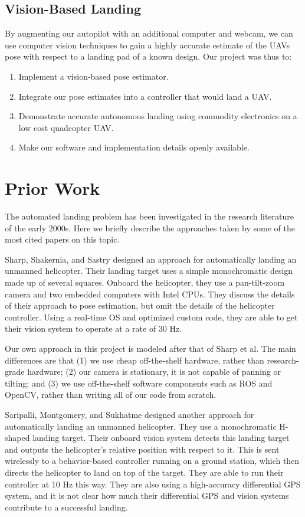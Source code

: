 \documentclass[10pt]{scrartcl} %
\begin{document}
\subsection{Vision-Based Landing}
By augmenting our autopilot with an additional computer and webcam, we can use computer vision techniques to gain a highly accurate estimate of the UAVs pose with respect to a landing pad of a known design.
Our project was thus to:
\begin{enumerate}
\item{Implement a vision-based pose estimator.}
\item{Integrate our pose estimates into a controller that would land a UAV.}
\item{Demonstrate accurate autonomous landing using commodity electronics on a low cost quadcopter UAV.}
\item{Make our software and implementation details openly available.}
\end{enumerate}

\section{Prior Work}

The automated landing problem has been investigated in the research literature
of the early 2000s. Here we briefly describe the approaches taken by some of
the most cited papers on this topic.

Sharp, Shakernia, and Sastry \cite{sharp_et_al_2001} designed an approach for
automatically landing an unmanned helicopter. Their landing target uses a
simple monochromatic design made up of several squares. Onboard the helicopter,
they use a pan-tilt-zoom camera and two embedded computers with Intel CPUs.
They discuss the details of their approach to pose estimation, but omit the
details of the helicopter controller. Using a real-time OS and optimized custom
code, they are able to get their vision system to operate at a rate of 30 Hz.

Our own approach in this project is modeled after that of Sharp et al. The main
differences are that (1) we use cheap off-the-shelf hardware, rather than
research-grade hardware; (2) our camera is stationary, it is not capable of
panning or tilting; and (3) we use off-the-shelf software components such as
ROS and OpenCV, rather than writing all of our code from scratch.

Saripalli, Montgomery, and Sukhatme \cite{saripalli_et_al_2002} designed
another approach for automatically landing an unmanned helicopter. They use a
monochromatic H-shaped landing target. Their onboard vision system detects this
landing target and outputs the helicopter's relative position with respect to
it. This is sent wirelessly to a behavior-based controller running on a ground
station, which then directs the helicopter to land on top of the target. They
are able to run their controller at 10 Hz this way. They are also using a
high-accuracy differential GPS system, and it is not clear how much their
differential GPS and vision systems contribute to a successful landing.
\end{document}
